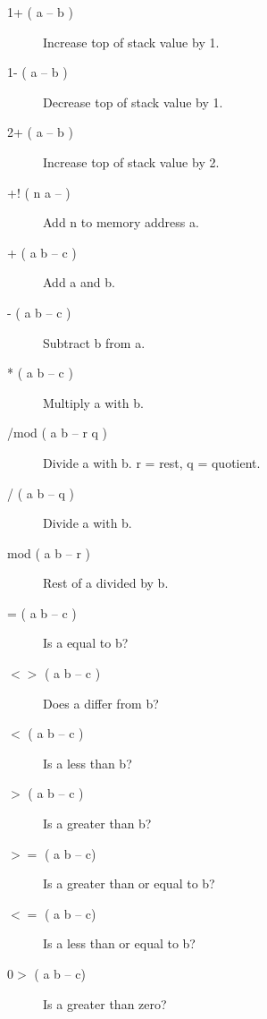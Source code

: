 \begin{description}

\item[1+ ( a -- b )]

Increase top of stack value by 1.

\item[1- ( a -- b )]

Decrease top of stack value by 1.

\item[2+ ( a -- b )]

Increase top of stack value by 2.

\item[+! ( n a -- )]

Add n to memory address a.

\item[+ ( a b -- c )]

Add a and b.

\item[- ( a b -- c )]

Subtract b from a.

\item[* ( a b -- c )]

Multiply a with b.

\item[/mod ( a b -- r q )]

Divide a with b. r = rest, q = quotient.

\item[/ ( a b -- q )]

Divide a with b.

\item[mod ( a b -- r )]

Rest of a divided by b.

\item[= ( a b -- c )]

Is a equal to b?

\item[$<>$ ( a b -- c )]

Does a differ from b?

\item[$<$ ( a b -- c )]

Is a less than b?

\item[$>$ ( a b -- c )]

Is a greater than b?

\item[$>=$ ( a b -- c)]

Is a greater than or equal to b?

\item[$<=$ ( a b -- c)]

Is a less than or equal to b?

\item[$0>$ ( a b -- c)]

Is a greater than zero?

\end{description}

